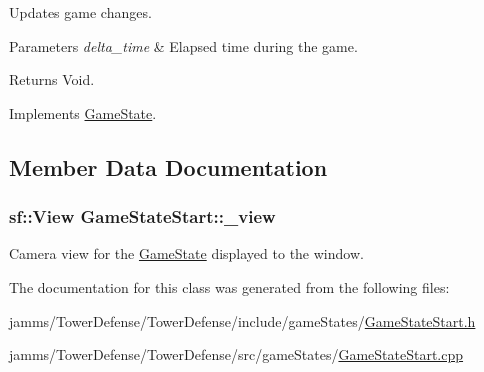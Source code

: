 Updates game changes. 


\begin{DoxyParams}{Parameters}
{\em delta\+\_\+time} & Elapsed time during the game. \\
\hline
\end{DoxyParams}
\begin{DoxyReturn}{Returns}
Void. 
\end{DoxyReturn}


Implements \hyperlink{class_game_state_ad331d02d3989271b8cbc88fcb1448959}{Game\+State}.



\subsection{Member Data Documentation}
\hypertarget{class_game_state_start_a9e9f769aa982160e124621cc4ceade62}{
\subsubsection[{\+\_\+view}]{\setlength{\rightskip}{0pt plus 5cm}sf\+::\+View Game\+State\+Start\+::\+\_\+view\hspace{0.3cm}{\ttfamily [private]}}}\label{class_game_state_start_a9e9f769aa982160e124621cc4ceade62}


Camera view for the \hyperlink{class_game_state}{Game\+State} displayed to the window. 



The documentation for this class was generated from the following files\+:\begin{DoxyCompactItemize}
\item 
jamms/\+Tower\+Defense/\+Tower\+Defense/include/game\+States/\hyperlink{_game_state_start_8h}{Game\+State\+Start.\+h}\item 
jamms/\+Tower\+Defense/\+Tower\+Defense/src/game\+States/\hyperlink{_game_state_start_8cpp}{Game\+State\+Start.\+cpp}\end{DoxyCompactItemize}
